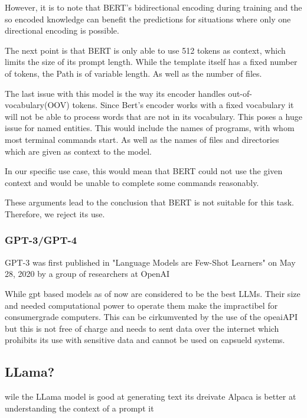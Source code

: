 However, it is to note that BERT's bidirectional encoding during training and the so encoded knowledge can benefit the predictions  for situations where only one directional encoding is possible.

The next point is that BERT is only able to use 512 tokens as context, which limits the size of its prompt length. While the template itself has a fixed number of tokens, the Path is of variable length. As well as the number of files.



The last issue with this model is the way its encoder handles out-of-vocabulary(OOV) tokens. Since Bert's encoder works with a fixed vocabulary it will not be able to process words that are not in its vocabulary. This poses a huge issue for named entities. This would include the names of programs, with whom most terminal commands start. As well as the names of files and directories which are given as context to the model. 

In our specific use case, this would mean that BERT could not use the given context and would be unable to complete some commands reasonably. 



These arguments lead to the conclusion that BERT is not suitable for this task. Therefore, we reject its use.





\subsubsection{GPT-3/GPT-4}

GPT-3 was first published in "Language Models are Few-Shot Learners" on May 28, 2020
by a group of researchers at OpenAI

While gpt based models as of now are considered to be the best LLMs. Their size and needed computational power to operate them make the impractibel for consumergrade computers. This can be cirkumvented by the use of the opeaiAPI but this is not free of charge and needs to sent data over the internet which prohibits its use with sensitive data and cannot be used on capsueld systems. 

\subsection{ LLama?} 
wile the LLama model is good at generating text its dreivate Alpaca is better at understanding the context of a prompt it 


